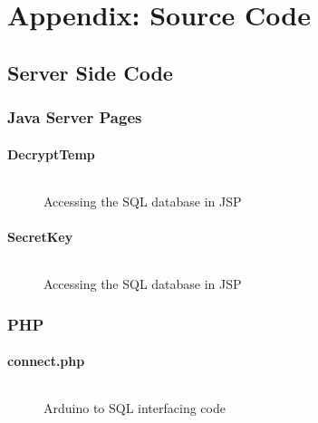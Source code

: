 
\chapter{Appendix: Source Code} %

\label{AppendixA} %

\section{Server Side Code}

\subsection{Java Server Pages}

\subsubsection{DecryptTemp}

\begin{figure}[H]
\begin{lstlisting}[style=Java]

\end{lstlisting}
\caption{Accessing the SQL database in JSP}
\label{snip:jspcode}
\end{figure}


\subsubsection{SecretKey}

\begin{figure}[H]
\begin{lstlisting}[style=Java]

\end{lstlisting}
\caption{Accessing the SQL database in JSP}
\label{snip:jspcode}
\end{figure}


\subsection{PHP}

\subsubsection{connect.php}

\begin{figure}[H]
\begin{lstlisting}[style=PHP]

\end{lstlisting}
\caption{Arduino to SQL interfacing code}
\label{snip:php}
\end{figure}

